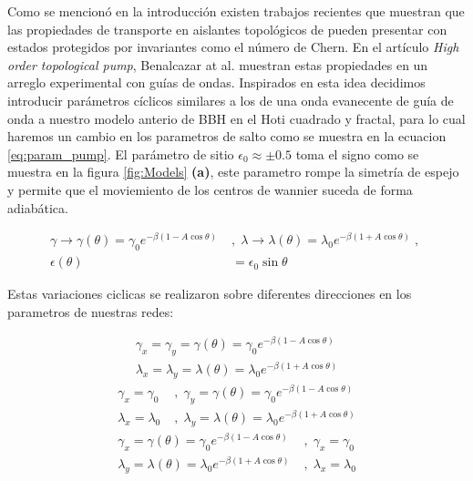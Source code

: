Como se mencionó en la introducción existen trabajos recientes que muestran que las propiedades de transporte en aislantes topológicos de pueden presentar con estados protegidos por invariantes como el número de Chern. En el artículo \textit{High order topological pump}\cite{benalcazar2020higher}, Benalcazar at al. muestran estas propiedades en un arreglo experimental con guías de ondas. Inspirados en esta idea decidimos introducir parámetros cíclicos similares a los de una onda evanecente de guía de onda a nuestro modelo anterio de BBH en el Hoti cuadrado y fractal, para lo cual haremos un cambio en los parametros de salto como se muestra en la ecuacion \ref{eq:param_pump}. El parámetro de sitio $\epsilon_0 \approx \pm 0.5$ toma el signo como se muestra en la figura \ref{fig:Models} \textbf{(a)}, este parametro rompe la simetría de espejo y permite que el moviemiento de los centros de wannier suceda de forma adiabática.



\begin{align}
    \label{eq:param_pump}
    \nonumber\gamma \rightarrow \gamma (\theta) = \gamma_0 e^{\displaystyle-\beta(1 - A \cos \theta )} \; &,\;  \lambda \rightarrow \lambda(\theta) = \lambda_0 e^{\displaystyle-\beta( 1 + A \cos \theta )} \;,\; \\  \epsilon(\theta) &= \epsilon_0 \sin \theta
\end{align}

Estas variaciones ciclicas se realizaron sobre diferentes direcciones en los parametros de nuestras redes: 

\begin{align}
    \label{eq:param_pumpxy}
    \nonumber \gamma_x = \gamma_y = \gamma (\theta) = \gamma_0 e^{\displaystyle-\beta(1 - A \cos \theta )} \\ \lambda_x = \lambda_y = \lambda(\theta) = \lambda_0 e^{\displaystyle-\beta( 1 + A \cos \theta )}
\end{align}
\begin{align}
    \label{eq:param_pumpx}
    \nonumber \gamma_x =\gamma_0 \; &,\; \gamma_y = \gamma (\theta) = \gamma_0 e^{\displaystyle-\beta(1 - A \cos \theta )} \\
    \lambda_x = \lambda_0  \; &,\;  \lambda_y = \lambda(\theta) = \lambda_0 e^{\displaystyle-\beta( 1 + A \cos \theta )}
\end{align}
\begin{align}
    \label{eq:param_pumpy}
    \nonumber \gamma_x = \gamma (\theta) = \gamma_0 e^{\displaystyle-\beta(1 - A \cos \theta )}   \; &,\; \gamma_x =\gamma_0 \\
    \lambda_y = \lambda(\theta) = \lambda_0 e^{\displaystyle-\beta( 1 + A \cos \theta )} \; &,\; \lambda_x = \lambda_0  
\end{align}

